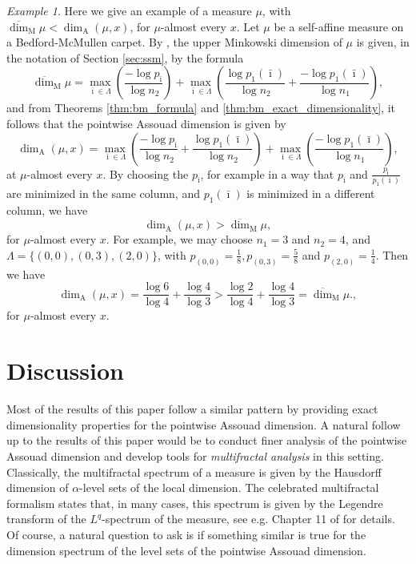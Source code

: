 \documentclass{PRM}
\newcommand{\updim}{\overline{\dim}}
\newcommand{\adim}{\dim_{\mathrm{A}}}
\theoremstyle{plain}
\theoremstyle{definition}
\theoremstyle{remark}
\newtheorem{example}[thm]{Example}
\begin{document}
\begin{example}\label{ex:bm_example}
    Here we give an example of a measure $\mu$, with $\updim_{\mathrm{M}}\mu<\adim(\mu,x)$, for $\mu$-almost every $x$. Let $\mu$ be a self-affine measure on a Bedford-McMullen carpet. By \cite[Theorem 8.6.2]{F}, the upper Minkowski dimension of $\mu$ is given, in the notation of Section \ref{sec:ssm}, by the formula
    \begin{equation*}
        \updim_{\mathrm{M}}\mu=\max_{\bar{\imath}\in\Lambda}\left(\frac{-\log p_{\bar{\imath}}}{\log n_2}\right)+\max_{\bar{\imath}\in\Lambda}\left(\frac{\log p_1(\bar{\imath})}{\log n_2}+\frac{-\log p_1(\bar{\imath})}{\log n_1}\right),
    \end{equation*}
    and from Theorems \ref{thm:bm_formula} and \ref{thm:bm_exact_dimensionality}, it follows that the pointwise Assouad dimension is given by
    \begin{equation*}
        \adim(\mu,x)=\max_{\bar{\imath}\in\Lambda}\left(\frac{-\log p_{\bar{\imath}}}{\log n_2}+\frac{\log p_1(\bar{\imath})}{\log n_2}\right)+\max_{\bar{\imath}\in\Lambda}\left(\frac{-\log p_1(\bar{\imath})}{\log n_1}\right),
    \end{equation*}
    at $\mu$-almost every $x$. By choosing the $p_{\bar{\imath}}$, for example in a way that $p_{\bar{\imath}}$ and $\frac{p_{\bar{\imath}}}{p_1(\bar{\imath})}$ are minimized in the same column, and $p_1(\bar{\imath})$ is minimized in a different column, we have
    \begin{equation*}
        \adim(\mu,x)>\updim_{\mathrm{M}}\mu,
    \end{equation*}
    for $\mu$-almost every $x$. For example, we may choose $n_1=3$ and $n_2=4$, and $\Lambda=\{(0,0),(0,3),(2,0)\}$, with $p_{(0,0)}=\frac{1}{8},p_{(0,3)}=\frac{5}{8}$ and $p_{(2,0)}=\frac{1}{4}$. Then we have
    \begin{equation*}
        \adim(\mu,x)=\frac{\log 6}{\log 4}+\frac{\log 4}{\log 3}> \frac{\log2}{\log 4}+\frac{\log 4}{\log 3}=\updim_{\mathrm{M}}\mu.,
    \end{equation*}
    for $\mu$-almost every $x$.
    \end{example}

\section{Discussion}
Most of the results of this paper follow a similar pattern by providing exact dimensionality properties for the pointwise Assouad dimension. A natural follow up to the results of this paper would be to conduct finer analysis of the pointwise Assouad dimension and develop tools for \emph{multifractal analysis} in this setting. Classically, the multifractal spectrum of a measure is given by the Hausdorff dimension of $\alpha$-level sets of the local dimension.
The celebrated multifractal formalism states that, in many cases, this spectrum is given by the Legendre transform of the $L^q$-spectrum of the measure, see e.g. Chapter 11 of \cite{Falc1} for details. Of course, a natural question to ask is if something similar is true for the dimension spectrum of the level sets of the pointwise Assouad dimension.
\end{document}
